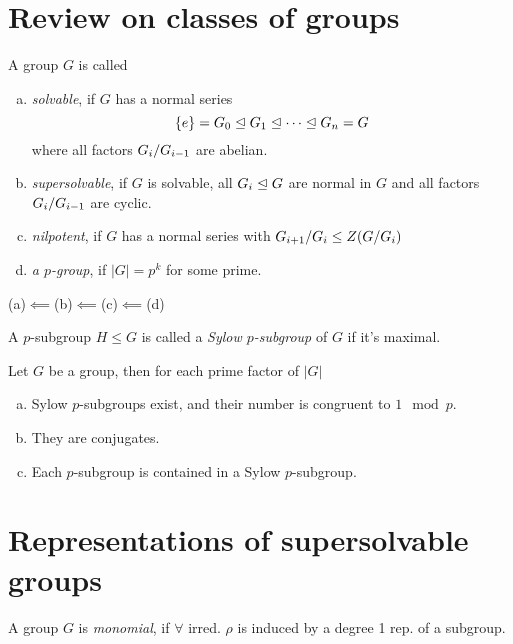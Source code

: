 \documentclass{article}
\begin{document}
\begin{multicols*}{2}
\section{Review on classes of groups}
\begin{defi}
  A group $G$ is called
  \begin{enumerate}[(a)]
    \item \emph{solvable}, if $G$ has a normal series
          \[\{e\} = G_{0} \trianglelefteq G_{1} \trianglelefteq \cdots \trianglelefteq G_{n} = G\]
          where all factors $\fak {G_{i}}{G_{i-1}}$ are abelian.
    \item \emph{supersolvable}, if $G$ is solvable, all $G_{i} \trianglelefteq G$ are normal in $G$ and all factors $\fak {G_{i}}{G_{i-1}}$ are cyclic.
    \item \emph{nilpotent}, if $G$ has a normal series with $\fak{G_{i+1}}{G_{i}} \le Z(\fak{G}{G_{i}})$
    \item \emph{a $p$-group}, if $|G| = p^{k}$ for some prime.
  \end{enumerate}
\end{defi}
\begin{rem}
(a)$\impliedby$(b)$\impliedby$(c)$\impliedby$(d)
\end{rem}
\begin{defi}
A $p$-subgroup $H \le G$ is called a \emph{Sylow $p$-subgroup} of $G$ if it's maximal.
\end{defi}

\begin{thm}[Sylow]
  Let $G$ be a group, then for each prime factor of $|G|$
  \begin{enumerate}[(a)]
    \item Sylow $p$-subgroups exist, and their number is congruent to $1 \mod p$.
    \item They are conjugates.
    \item Each $p$-subgroup is contained in a Sylow $p$-subgroup.
  \end{enumerate}

\end{thm}



\section{Representations of supersolvable groups}
\begin{defi}[Monomial]
  A group $G$ is \emph{monomial}, if $\forall$ irred. $\rho$ is induced by a degree 1 rep. of a subgroup.
\end{defi}


\end{multicols*}
\end{document}
